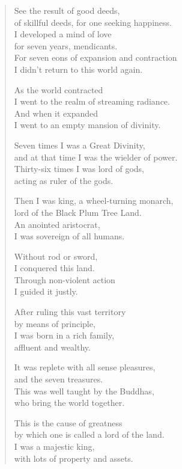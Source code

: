 \documentclass[12pt,openany]{book}%
\begin{document}
\begin{verse}%
See the result of good deeds, \\
of skillful deeds, for one seeking happiness. \\
I developed a mind of love \\
for seven years, mendicants. \\
For seven eons of expansion and contraction \\
I didn’t return to this world again. 

As the world contracted \\
I went to the realm of streaming radiance. \\
And when it expanded \\
I went to an empty mansion of divinity. 

Seven times I was a Great Divinity, \\
and at that time I was the wielder of power. \\
Thirty-six times I was lord of gods, \\
acting as ruler of the gods. 

Then I was king, a wheel-turning monarch, \\
lord of the Black Plum Tree Land. \\
An anointed aristocrat, \\
I was sovereign of all humans. 

Without rod or sword, \\
I conquered this land. \\
Through non-violent action \\
I guided it justly. 

After ruling this vast territory \\
by means of principle, \\
I was born in a rich family, \\
affluent and wealthy. 

It was replete with all sense pleasures, \\
and the seven treasures. \\
This was well taught by the Buddhas, \\
who bring the world together. 

This is the cause of greatness \\
by which one is called a lord of the land. \\
I was a majestic king, \\
with lots of property and assets. 


\end{verse}
\end{document}

